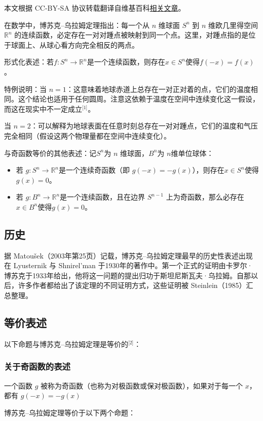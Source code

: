 
本文根据 CC-BY-SA 协议转载翻译自维基百科\href{https://en.wikipedia.org/wiki/Borsuk\%E2\%80\%93Ulam_theorem}{相关文章}。

在数学中，博苏克–乌拉姆定理指出：每一个从 $n$ 维球面 $S^n$ 到 $n$ 维欧几里得空间 $\mathbb{R}^n$ 的连续函数，必定存在一对对踵点被映射到同一个点。这里，对踵点指的是位于球面上、从球心看方向完全相反的两点。

形式化表述：若$f: S^n \to \mathbb{R}^n$是一个连续函数，则存在$x \in S^n$使得$f(-x) = f(x)$。

特例说明：当 $ n = 1$：这意味着地球赤道上总存在一对正对着的点，它们的温度相同。这个结论也适用于任何圆周。注意这依赖于温度在空间中连续变化这一假设，而这在现实中不一定成立\(^\text{[1]}\)。

当 $ n = 2 $：可以解释为地球表面在任意时刻总存在一对对踵点，它们的温度和气压完全相同（假设这两个物理量都在空间中连续变化）。

与奇函数等价的其他表述：记$ S^n $为 $n$ 维球面，$ B^n $为 $n$维单位球体：
\begin{itemize}
\item 若  $g: S^n \to \mathbb{R}^n$是一个连续奇函数（即 $g(-x) = -g(x)$），则存在$x \in S^n$使得$g(x) = 0$。
\item 若 $g: B^n \to \mathbb{R}^n$是一个连续函数，且在边界 $S^{n-1}$ 上为奇函数，那么必存在$x \in B^n$使得$g(x) = 0$。
\end{itemize}
\subsection{历史}
据 Matoušek（2003年第25页）记载，博苏克–乌拉姆定理最早的历史性表述出现在 Lyusternik 与 Shnirel'man 于1930年的著作中。第一个正式的证明由卡罗尔·博苏克于1933年给出，他将这一问题的提出归功于斯坦尼斯瓦夫·乌拉姆。自那以后，许多作者都给出了该定理的不同证明方式，这些证明被 Steinlein（1985）汇总整理。
\subsection{等价表述}
以下命题与博苏克–乌拉姆定理是等价的\(^\text{[2]}\)：
\subsubsection{关于奇函数的表述}
一个函数 $g$ 被称为奇函数（也称为对极函数或保对极函数），如果对于每一个 $x$，都有
$g(-x) = -g(x)$

博苏克–乌拉姆定理等价于以下两个命题：

